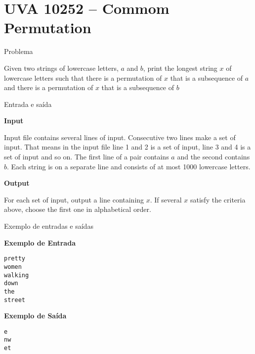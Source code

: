 \section{UVA 10252 -- Commom Permutation}

\begin{frame}[fragile]{Problema}

Given two strings of lowercase letters, $a$ and $b$, print the longest string $x$ of lowercase 
letters such that there is a permutation of $x$ that is a subsequence of $a$ and there is a 
permutation of $x$ that is a subsequence of $b$

\end{frame}

\begin{frame}[fragile]{Entrada e saída}

\textbf{Input}

Input file contains several lines of input. Consecutive two lines make a set of input. That means 
in the input file line 1 and 2 is a set of input, line 3 and 4 is a set of input and so on. The 
first line of a pair contains $a$ and the second contains $b$. Each string is on a separate line 
and consists of at most 1000 lowercase letters.

\vspace{0.1in}

\textbf{Output}

For each set of input, output a line containing $x$. If several $x$ satisfy the criteria above, 
choose the first one in alphabetical order.

\end{frame}

\begin{frame}[fragile]{Exemplo de entradas e saídas}

\begin{minipage}[t]{0.5\textwidth}
\textbf{Exemplo de Entrada}
\begin{verbatim}
pretty
women
walking
down
the
street
\end{verbatim}
\end{minipage}
\begin{minipage}[t]{0.45\textwidth}
\textbf{Exemplo de Saída}
\begin{verbatim}
e
nw
et
\end{verbatim}
\end{minipage}
\end{frame}

